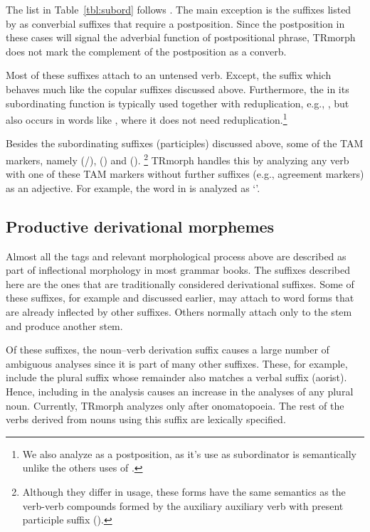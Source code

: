 \documentclass[twocolumn]{article}
\begin{document}
The list in Table~\ref{tbl:subord} follows \cite{goksel2005}. The main
exception is the suffixes listed by \cite{goksel2005} as converbial
suffixes that require a postposition. Since the postposition in these
cases will signal the adverbial function of postpositional phrase,
TRmorph does not mark the complement of the postposition as a converb.

%
%

Most of these suffixes attach to an untensed verb. Except, the suffix
 which behaves much like the copular suffixes discussed
above. Furthermore, the  in its subordinating function
is typically used together with reduplication, e.g., , but also occurs in words like
, where it does not need reduplication.\footnote{We
also analyze  as a postposition, as it's use as
subordinator is semantically unlike the others uses of .}

Besides the subordinating suffixes (participles) discussed above, 
some of the TAM markers, 
namely  (/),  () and  ().%
\footnote{Although they differ in usage, 
these forms have the same semantics as 
the verb-verb compounds formed by the auxiliary auxiliary verb  with present participle suffix ().}
TRmorph handles this by analyzing any verb with one of these TAM markers without further suffixes 
(e.g., agreement markers) as an adjective. 
For example, the word 
 in 
is analyzed as
`'.

\subsection{Productive derivational morphemes}

Almost all the tags and relevant morphological process above are
described as part of inflectional morphology in most grammar books.
The suffixes described here are the ones that are traditionally
considered derivational suffixes. Some of these suffixes, for example
 and  discussed earlier, may attach to word forms
that are already inflected by other suffixes. Others normally attach
only to the stem and produce another stem.

Of these suffixes, the noun--verb derivation suffix  causes a
large number of ambiguous analyses since it is part of many other
suffixes. These, for example, include the plural suffix 
whose remainder  also matches a verbal suffix (aorist).
Hence, including  in the analysis causes an increase in the
analyses of any plural noun. Currently, TRmorph analyzes 
only after onomatopoeia. The rest of the verbs derived from nouns
using this suffix are lexically specified.
\end{document}
